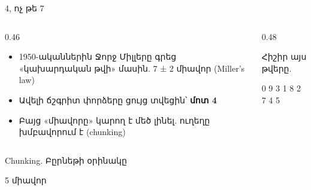 \begin{frame}{4, ոչ թե 7}
  \begin{columns}[T]
    \begin{column}{0.46\textwidth}
      \begin{itemize}
        \item 1950-ականներին Ջորջ Միլլերը գրեց «կախարդական թվի» մասին. 7 ± 2 միավոր (Miller's law)
        \item Ավելի ճշգրիտ փորձերը ցույց տվեցին՝ \textbf{մոտ 4}
        \item Բայց «միավորը» կարող է մեծ լինել. ուղեղը խմբավորում է (chunking)
      \end{itemize}
    \end{column}
    \begin{column}{0.48\textwidth}
      \begin{tryit}
        Հիշիր այս թվերը.\par\smallskip
        {\blackfont\Large 0 9 3 1 8 2 7 4 5}\par\smallskip
      \end{tryit}
    \end{column}
  \end{columns}
\end{frame}

\begin{frame}{Chunking. Բըրնեթի օրինակը}
  \centering
  \quad{}\quad{}\quad{}\quad{}\par\smallskip
  {\small 5 միավոր}\par\bigskip
\end{frame}


